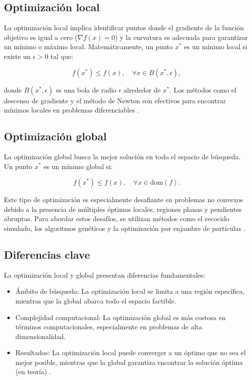 \begin{itemize}
	\subsection{Optimización local}
	
	La optimización local implica identificar puntos donde el gradiente de la función objetivo es igual a cero (\(\nabla f(x) = 0\)) y la curvatura es adecuada para garantizar un mínimo o máximo local. Matemáticamente, un punto \(x^*\) es un mínimo local si existe un \(\epsilon > 0\) tal que:
	
	\begin{equation}
		f(x^*) \leq f(x), \quad \forall x \in B(x^*, \epsilon),
	\end{equation}
	
	donde \(B(x^*, \epsilon)\) es una bola de radio \(\epsilon\) alrededor de \(x^*\). Los métodos como el descenso de gradiente y el método de Newton son efectivos para encontrar mínimos locales en problemas diferenciables \cite{nocedal1999optimization}.
	
	\subsection{Optimización global}
	
	La optimización global busca la mejor solución en todo el espacio de búsqueda. Un punto \(x^*\) es un mínimo global si:
	
	\begin{equation}
		f(x^*) \leq f(x), \quad \forall x \in \text{dom}(f).
	\end{equation}
	
	Este tipo de optimización es especialmente desafiante en problemas no convexos debido a la presencia de múltiples óptimos locales, regiones planas y pendientes abruptas. Para abordar estos desafíos, se utilizan métodos como el recocido simulado, los algoritmos genéticos y la optimización por enjambre de partículas \cite{floudas2013deterministic}.
	
	\subsection{Diferencias clave}
	
	La optimización local y global presentan diferencias fundamentales:
	
	\begin{itemize}
		\item Ámbito de búsqueda: La optimización local se limita a una región específica, mientras que la global abarca todo el espacio factible.
		\item Complejidad computacional: La optimización global es más costosa en términos computacionales, especialmente en problemas de alta dimensionalidad.
		\item Resultados: La optimización local puede converger a un óptimo que no sea el mejor posible, mientras que la global garantiza encontrar la solución óptima (en teoría) \cite{pinter2013global}.
	\end{itemize}
	

\end{itemize}
